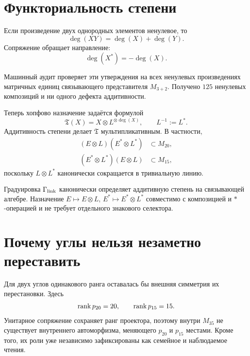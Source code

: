 \section{Функториальность степени}

Если произведение двух однородных элементов ненулевое, то
\begin{equation}
 \deg(XY)=\deg(X)+\deg(Y).
 \label{eq:v5-hopf-degree-additivity}
\end{equation}
Сопряжение обращает направление:
\begin{equation}
 \deg(X^*)=-\deg(X).
 \label{eq:v5-hopf-degree-star}
\end{equation}

Машинный аудит проверяет эти утверждения на всех ненулевых произведениях
матричных единиц связывающего представителя $M_{3+2}$. Получено $125$
ненулевых композиций и ни одного дефекта аддитивности.

Теперь хопфово назначение задаётся формулой
\begin{equation}
 \mathfrak T(X)=X\otimes L^{\otimes\deg(X)},
 \qquad
 L^{-1}:=L^*.
 \label{eq:v5-hopf-orientation-functor}
\end{equation}
Аддитивность степени делает $\mathfrak T$ мультипликативным. В частности,
\begin{align}
 (E\otimes L)(E^*\otimes L^*)&\subset M_{20},\\
 (E^*\otimes L^*)(E\otimes L)&\subset M_{15},
\end{align}
поскольку $L\otimes L^*$ канонически сокращается в тривиальную линию.

\begin{theorem}
Градуировка $\Gamma_{\rm link}$ канонически определяет аддитивную степень
на связывающей алгебре. Назначение
$E\mapsto E\otimes L$, $E^*\mapsto E^*\otimes L^*$ совместимо с
композицией и $*$-операцией и не требует отдельного знакового селектора.
\end{theorem}

\section{Почему углы нельзя незаметно переставить}

Для двух углов одинакового ранга оставалась бы внешняя симметрия их
перестановки. Здесь
\begin{equation}
 \operatorname{rank} p_{20}=20,
 \qquad
 \operatorname{rank} p_{15}=15.
\end{equation}
Унитарное сопряжение сохраняет ранг проектора, поэтому внутри $M_{35}$ не
существует внутреннего автоморфизма, меняющего $p_{20}$ и $p_{15}$
местами. Кроме того, их роли уже независимо зафиксированы как семейное и
наблюдаемое чтения.

